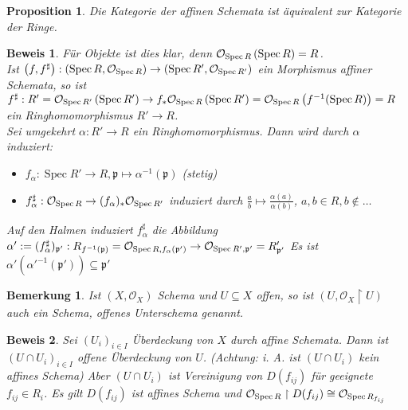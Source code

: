 \documentclass[a4paper,oneside]{scrbook}
\theoremstyle{break}
\newtheorem{Bem}[Def]{Bemerkung}
\newtheorem{Prop}[Def]{Proposition}
\theoremstyle{nonumberbreak}
\theoremstyle{nonumberplain}
\newtheorem{Bew}{Beweis}
\theoremstyle{break}
\newcommand{\Spec}{%
	\ensuremath{\operatorname{Spec}}%
}
\begin{document}
\begin{Prop}
\label{prop:3.3}
 Die Kategorie der affinen Schemata ist äquivalent zur Kategorie der Ringe.
\end{Prop}
\begin{Bew}
	Für Objekte ist dies klar, denn $\mathcal{O}_{\Spec R}\left(\Spec R\right) = R$. \\
	Ist $\left( f, f^\sharp \right): \left( \Spec R,\mathcal{O}_{\Spec R} \right)  \rightarrow \left( \Spec R',\mathcal{O}_{\Spec R'} \right)$ ein Morphismus affiner Schemata, so ist $f^\sharp: R' =\mathcal{O}_{\Spec R'}\left(\Spec R'\right) \rightarrow  f_* \mathcal{O}_{\Spec R}\left(\Spec R'\right)=\mathcal{O}_{\Spec R}\left(f^{-1} (\Spec R)\right) = R$ ein Ringhomomorphismus $R' \rightarrow R$. \\
	Sei umgekehrt $\alpha : R' \rightarrow R$ ein Ringhomomorphismus. Dann wird durch $\alpha$ induziert: 
	\begin{itemize}
		\item $f_\alpha : \Spec R' \rightarrow R, \mathfrak{p} \mapsto \alpha^{-1}(\mathfrak{p})$  (stetig)
		\item $f_\alpha^\sharp: \mathcal{O}_{\Spec R} \rightarrow (f_\alpha)_* \mathcal{O}_{\Spec R'}$ induziert durch $\frac{a}{b} \mapsto \frac{\alpha(a)}{\alpha(b)}$, $a,b \in R, b \notin \dots$ 
	\end{itemize}
	Auf den Halmen induziert $f_\alpha^\sharp$ die Abbildung $\alpha':= (f_\alpha^\sharp)_{\mathfrak{p}'}: R_{f^{-1}(\mathfrak{p})} = \mathcal{O}_{\Spec R, f_\alpha(\mathfrak{p}')} \rightarrow  \mathcal{O}_{\Spec R', \mathfrak{p}'}= R'_{\mathfrak{p}'}$
	Es ist $\alpha' (\alpha'^{-1} (\mathfrak{p}') ) \subseteq \mathfrak{p}'$
\end{Bew}

\begin{Bem}
	Ist $\left( X, \mathcal{O}_X \right)$ Schema und $U \subseteq X$ offen, so ist $\left( U, \mathcal{O}_X \restriction U \right)$ auch ein Schema, offenes Unterschema genannt.
\end{Bem}
\begin{Bew}
 Sei $(U_i)_{i \in I}$ Überdeckung von $X$ durch affine Schemata. Dann ist $(U \cap U_i)_{i \in I}$ offene Überdeckung von $U$. (Achtung: i. A. ist $(U \cap U_i)$ kein affines Schema) Aber $(U \cap U_i)$ ist Vereinigung von $D(f_{ij})$ für geeignete $f_{ij} \in R_i$. Es gilt $D(f_{ij})$ ist affines Schema und $\mathcal{O}_{\Spec R} \restriction D(f_{ij}) \cong \mathcal{O}_{\Spec R_{f_{ij}}}$
\end{Bew}
\end{document}
